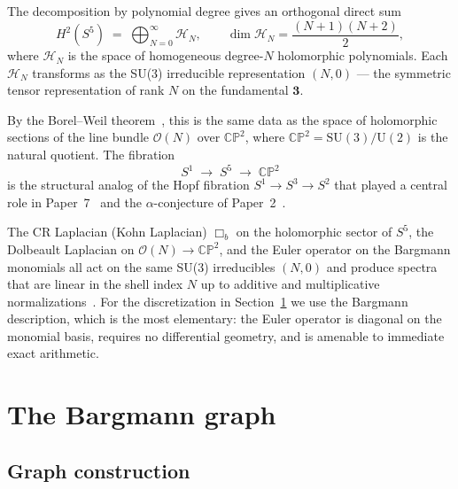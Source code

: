 \documentclass[twocolumn,pra,amsmath,amssymb,superscriptaddress]{revtex4-2}
\begin{document}
The decomposition by polynomial degree gives an orthogonal direct
sum
\begin{equation}
  H^2(S^5)
  \;=\;
  \bigoplus_{N = 0}^{\infty}
  \mathcal{H}_N,
  \qquad
  \dim \mathcal{H}_N = \frac{(N+1)(N+2)}{2},
  \label{eq:hardy-decomp}
\end{equation}
where $\mathcal{H}_N$ is the space of homogeneous degree-$N$
holomorphic polynomials.  Each $\mathcal{H}_N$ transforms as the
SU(3) irreducible representation $(N, 0)$ — the symmetric tensor
representation of rank $N$ on the fundamental $\mathbf{3}$.

By the Borel--Weil theorem~\cite{borelweil}, this is the same data
as the space of holomorphic sections of the line bundle
$\mathcal{O}(N)$ over $\mathbb{CP}^2$, where $\mathbb{CP}^2 =
\mathrm{SU}(3) / \mathrm{U}(2)$ is the natural quotient.  The
fibration
\begin{equation}
  S^1 \;\longrightarrow\; S^5 \;\longrightarrow\; \mathbb{CP}^2
  \label{eq:s5-fibration}
\end{equation}
is the structural analog of the Hopf fibration $S^1 \to S^3 \to
S^2$ that played a central role in Paper~7~\cite{paper7} and the
$\alpha$-conjecture of Paper~2~\cite{paper2_alpha}.

The CR Laplacian (Kohn Laplacian) $\Box_b$ on the holomorphic
sector of $S^5$, the Dolbeault Laplacian on $\mathcal{O}(N) \to
\mathbb{CP}^2$, and the Euler operator on the Bargmann monomials
all act on the same SU(3) irreducibles $(N, 0)$ and produce
spectra that are linear in the shell index $N$ up to additive and
multiplicative normalizations~\cite{follandstein1974}.  For the
discretization in Section~\ref{sec:graph} we use the Bargmann
description, which is the most elementary: the Euler operator is
diagonal on the monomial basis, requires no differential geometry,
and is amenable to immediate exact arithmetic.

\section{The Bargmann graph}
\label{sec:graph}

\subsection{Graph construction}
\end{document}
